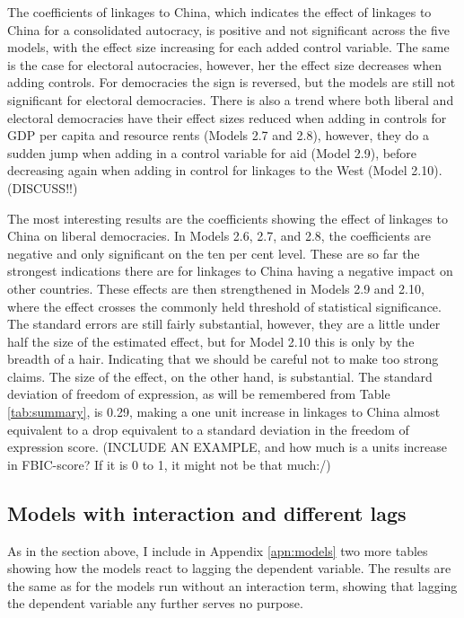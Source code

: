 The coefficients of linkages to China, which indicates the effect of linkages to China for a consolidated autocracy, is positive and not significant across the five models, with the effect size increasing for each added control variable. The same is the case for electoral autocracies, however, her the effect size decreases when adding controls. For democracies the sign is reversed, but the models are still not significant for electoral democracies. There is also a trend where both liberal and electoral democracies have their effect sizes reduced when adding in controls for GDP per capita and resource rents (Models 2.7 and 2.8), however, they do a sudden jump when adding in a control variable for aid (Model 2.9), before decreasing again when adding in control for linkages to the West (Model 2.10). (DISCUSS!!)

The most interesting results are the coefficients showing the effect of linkages to China on liberal democracies. In Models 2.6, 2.7, and 2.8, the coefficients are negative and only significant on the ten per cent level. These are so far the strongest indications there are for linkages to China having a negative impact on other countries. These effects are then strengthened in Models 2.9 and 2.10, where the effect crosses the commonly held threshold of statistical significance. The standard errors are still fairly substantial, however, they are a little under half the size of the estimated effect, but for Model 2.10 this is only by the breadth of a hair. Indicating that we should be careful not to make too strong claims. The size of the effect, on the other hand, is substantial. The standard deviation of freedom of expression, as will be remembered from Table \ref{tab:summary}, is 0.29, making a one unit increase in linkages to China almost equivalent to a drop equivalent to a standard deviation in the freedom of expression score. (INCLUDE AN EXAMPLE, and how much is a units increase in FBIC-score? If it is 0 to 1, it might not be that much:/)

\subsection{Models with interaction and different lags}
As in the section above, I include in Appendix \ref{apn:models} two more tables showing how the models react to lagging the dependent variable. The results are the same as for the models run without an interaction term, showing that lagging the dependent variable any further serves no purpose.

